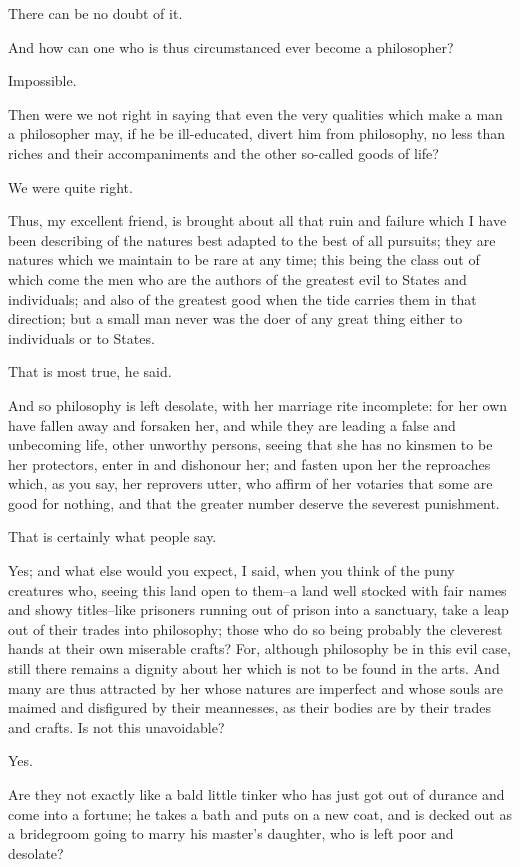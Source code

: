 There can be no doubt of it.

And how can one who is thus circumstanced ever become a philosopher?

Impossible.

Then were we not right in saying that even the very qualities which
make a man a philosopher may, if he be ill-educated, divert him from
philosophy, no less than riches and their accompaniments and the other
so-called goods of life?

We were quite right.

Thus, my excellent friend, is brought about all that ruin and failure
which I have been describing of the natures best adapted to the best of
all pursuits; they are natures which we maintain to be rare at any time;
this being the class out of which come the men who are the authors of
the greatest evil to States and individuals; and also of the greatest
good when the tide carries them in that direction; but a small man never
was the doer of any great thing either to individuals or to States.

That is most true, he said.

And so philosophy is left desolate, with her marriage rite incomplete:
for her own have fallen away and forsaken her, and while they are
leading a false and unbecoming life, other unworthy persons, seeing that
she has no kinsmen to be her protectors, enter in and dishonour her; and
fasten upon her the reproaches which, as you say, her reprovers utter,
who affirm of her votaries that some are good for nothing, and that the
greater number deserve the severest punishment.

That is certainly what people say.

Yes; and what else would you expect, I said, when you think of the puny
creatures who, seeing this land open to them--a land well stocked with
fair names and showy titles--like prisoners running out of prison into a
sanctuary, take a leap out of their trades into philosophy; those who
do so being probably the cleverest hands at their own miserable crafts?
For, although philosophy be in this evil case, still there remains a
dignity about her which is not to be found in the arts. And many are
thus attracted by her whose natures are imperfect and whose souls are
maimed and disfigured by their meannesses, as their bodies are by their
trades and crafts. Is not this unavoidable?

Yes.

Are they not exactly like a bald little tinker who has just got out of
durance and come into a fortune; he takes a bath and puts on a new coat,
and is decked out as a bridegroom going to marry his master's daughter,
who is left poor and desolate?


